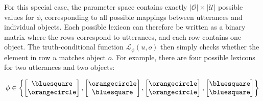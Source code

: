 For this special case, the parameter space contains exactly $|\mathcal{O}| \times |\mathcal{U}|$ possible values for $\phi$, corresponding to all possible mappings between utterances and individual objects. 
Each possible lexicon can therefore be written as a binary matrix where the rows correspond to utterances, and each row contains one object.
The truth-conditional function $\mathcal{L}_{\phi}(u,o)$ then simply checks whether the element in row $u$ matches object $o$.
For example, there are four possible lexicons for two utterances and two objects:

$$\phi \in \left\{\begin{bmatrix}
\bluesquare \\
\orangecircle \\
\end{bmatrix},
\begin{bmatrix}
\orangecircle \\
\bluesquare \\
\end{bmatrix},
\begin{bmatrix}
\orangecircle\\
\orangecircle \\
\end{bmatrix},
\begin{bmatrix}
\bluesquare  \\
\bluesquare \\
\end{bmatrix}\right\}$$

